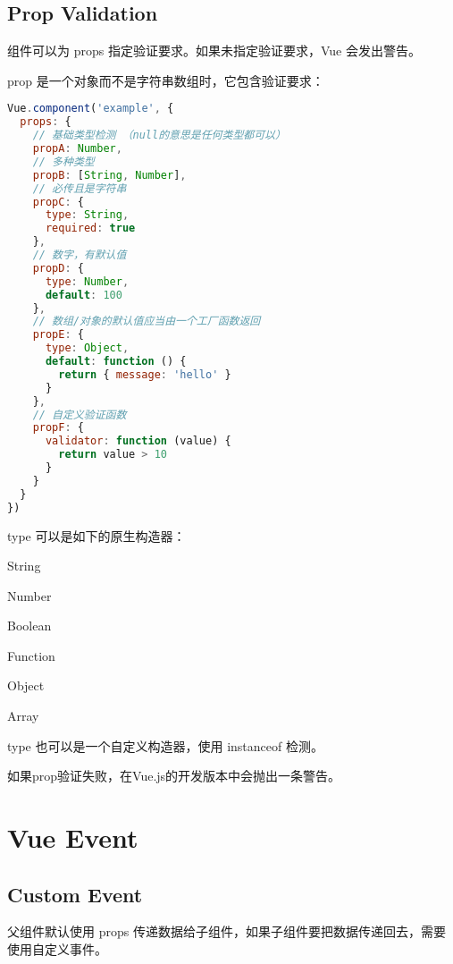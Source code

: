 \section{Prop Validation}

组件可以为 props 指定验证要求。如果未指定验证要求，Vue 会发出警告。


prop 是一个对象而不是字符串数组时，它包含验证要求：



\begin{lstlisting}[language=JavaScript]
Vue.component('example', {
  props: {
    // 基础类型检测 （null的意思是任何类型都可以）
    propA: Number,
    // 多种类型
    propB: [String, Number],
    // 必传且是字符串
    propC: {
      type: String,
      required: true
    },
    // 数字，有默认值
    propD: {
      type: Number,
      default: 100
    },
    // 数组/对象的默认值应当由一个工厂函数返回
    propE: {
      type: Object,
      default: function () {
        return { message: 'hello' }
      }
    },
    // 自定义验证函数
    propF: {
      validator: function (value) {
        return value > 10
      }
    }
  }
})
\end{lstlisting}

type 可以是如下的原生构造器：

\begin{compactitem}
\item String
\item Number
\item Boolean
\item Function
\item Object
\item Array
\end{compactitem}

type 也可以是一个自定义构造器，使用 instanceof 检测。

如果prop验证失败，在Vue.js的开发版本中会抛出一条警告。

\chapter{Vue Event}

\section{Custom Event}


父组件默认使用 props 传递数据给子组件，如果子组件要把数据传递回去，需要使用自定义事件。




